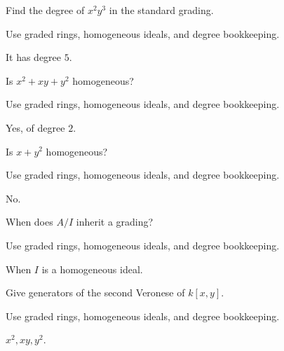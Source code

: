 \begin{exercise}[Degree]\label{exr:vi34-expand-01}
Find the degree of $x^2y^3$ in the standard grading.
\end{exercise}
\begin{hint}
Use graded rings, homogeneous ideals, and degree bookkeeping.
\end{hint}
\begin{solution}
It has degree $5$.
\end{solution}

\begin{exercise}\label{exr:vi34-expand-02}
Is $x^2+xy+y^2$ homogeneous?
\end{exercise}
\begin{hint}
Use graded rings, homogeneous ideals, and degree bookkeeping.
\end{hint}
\begin{solution}
Yes, of degree $2$.
\end{solution}

\begin{exercise}\label{exr:vi34-expand-03}
Is $x+y^2$ homogeneous?
\end{exercise}
\begin{hint}
Use graded rings, homogeneous ideals, and degree bookkeeping.
\end{hint}
\begin{solution}
No.
\end{solution}

\begin{exercise}\label{exr:vi34-expand-04}
When does $A/I$ inherit a grading?
\end{exercise}
\begin{hint}
Use graded rings, homogeneous ideals, and degree bookkeeping.
\end{hint}
\begin{solution}
When $I$ is a homogeneous ideal.
\end{solution}

\begin{exercise}\label{exr:vi34-expand-05}
Give generators of the second Veronese of $k[x,y]$.
\end{exercise}
\begin{hint}
Use graded rings, homogeneous ideals, and degree bookkeeping.
\end{hint}
\begin{solution}
$x^2,xy,y^2$.
\end{solution}

